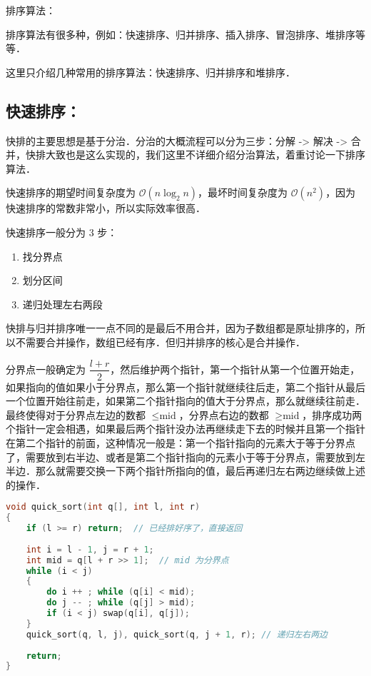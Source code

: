 
排序算法：

排序算法有很多种，例如：快速排序、归并排序、插入排序、冒泡排序、堆排序等等．

这里只介绍几种常用的排序算法：快速排序、归并排序和堆排序．

\subsection{快速排序：}

快排的主要思想是基于分治．分治的大概流程可以分为三步：分解 -> 解决 -> 合并，快排大致也是这么实现的，我们这里不详细介绍分治算法，着重讨论一下排序算法．

快速排序的期望时间复杂度为 $\mathcal{O}(n \log_2 n)$，最坏时间复杂度为 $\mathcal{O}(n^2)$，因为快速排序的常数非常小，所以实际效率很高．

快速排序一般分为 $3$ 步：
\begin{enumerate}
\item 找分界点
\item 划分区间
\item 递归处理左右两段
\end{enumerate}

快排与归并排序唯一一点不同的是最后不用合并，因为子数组都是原址排序的，所以不需要合并操作，数组已经有序．但归并排序的核心是合并操作．

分界点一般确定为 $\dfrac{l+r}{2}$，然后维护两个指针，第一个指针从第一个位置开始走，如果指向的值如果小于分界点，那么第一个指针就继续往后走，第二个指针从最后一个位置开始往前走，如果第二个指针指向的值大于分界点，那么就继续往前走．最终使得对于分界点左边的数都 $\leq \text{mid}$，分界点右边的数都 $\geq \text{mid}$，排序成功两个指针一定会相遇，如果最后两个指针没办法再继续走下去的时候并且第一个指针在第二个指针的前面，这种情况一般是：第一个指针指向的元素大于等于分界点了，需要放到右半边、或者是第二个指针指向的元素小于等于分界点，需要放到左半边．那么就需要交换一下两个指针所指向的值，最后再递归左右两边继续做上述的操作．


\begin{lstlisting}[language=cpp]
void quick_sort(int q[], int l, int r)
{
    if (l >= r) return;  // 已经排好序了，直接返回
		
    int i = l - 1, j = r + 1;
    int mid = q[l + r >> 1];  // mid 为分界点
    while (i < j)
    {
        do i ++ ; while (q[i] < mid);
        do j -- ; while (q[j] > mid);
        if (i < j) swap(q[i], q[j]);
    }
    quick_sort(q, l, j), quick_sort(q, j + 1, r); // 递归左右两边
    
    return;
}

\end{lstlisting}


